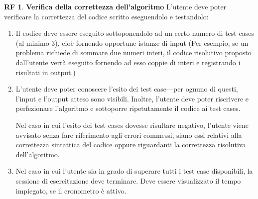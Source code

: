 \documentclass[11pt, a4paper]{article}
\theoremstyle{definition}
\newtheorem{funcreq}{RF} %
\begin{document}

\begin{funcreq}
\label{test}
\textbf{Verifica della correttezza dell'algoritmo }
L'utente deve poter verificare la correttezza del codice scritto eseguendolo
e testandolo:
\begin{enumerate}
    \item Il codice deve essere eseguito sottoponendolo ad un certo numero
    di test cases (al minimo 3), cioè fornendo opportune istanze di input
    (Per esempio, se un problema richiede di sommare due numeri interi, il
    codice risolutivo proposto dall'utente verrà eseguito fornendo ad esso
    coppie di interi e registrando i risultati in output.)

    \item L'utente deve poter conoscere l'esito dei test case—per ognuno
    di questi, l'input e l'output atteso sono visibili. Inoltre, l'utente
    deve poter riscrivere e perfezionare l'algoritmo e sottoporre ripetutamente
    il codice ai test cases.
    
    Nel caso in cui l'esito dei test cases dovesse risultare negativo, l'utente
    viene avvisato senza fare riferimento agli errori commessi, siano essi
    relativi alla correttezza sintattica del codice oppure riguardanti la
    correttezza risolutiva dell'algoritmo.

    \item Nel caso in cui l'utente sia in grado di superare tutti i
    test case disponibili, la sessione di esercitazione deve terminare.
    Deve essere visualizzato il tempo impiegato, se il cronometro è attivo.
\end{enumerate}
\end{funcreq}
\end{document}
